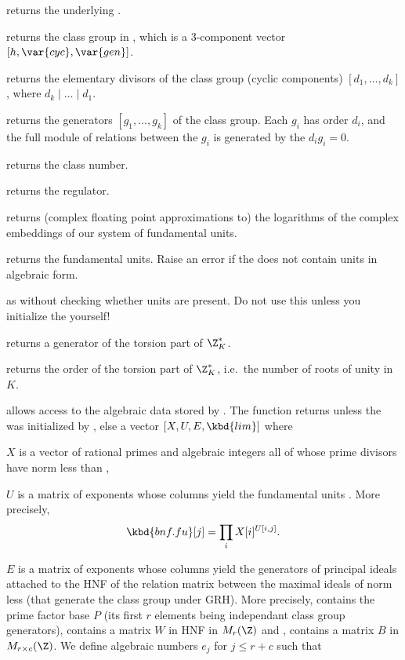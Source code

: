  returns the underlying .

 returns the class group in ,
which is a $3$-component vector $[h, \var{cyc}, \var{gen}]$.

 returns the elementary divisors
of the class group (cyclic components) $[d_1,\ldots, d_k]$, where
$d_k \mid \ldots \mid d_1$.

 returns the generators $[g_1,\ldots,g_k]$
of the class group. Each $g_i$ has order $d_i$, and the full module of relations
between the $g_i$ is generated by the $d_ig_i = 0$.

 returns the class number.

 returns the regulator.

 returns (complex floating point
approximations to) the logarithms of the complex embeddings of our system of
fundamental units.

 returns the fundamental units. Raise
an error if the  does not contain units in algebraic form.

 as  without
checking whether units are present. Do not use this unless
you initialize the  yourself!

 returns a generator of the torsion part
of $\Z_K^*$.

 returns the order of the torsion part of
$\Z_K^*$, i.e.~the number of roots of unity in $K$.

 allows access to the algebraic data
stored by . The function returns  unless the
 was initialized by , else a vector
$[X,U,E,\kbd{lim}]$ where

\item $X$ is a vector of rational primes and algebraic integers all of whose
prime divisors have norm less than ,

\item $U$ is a matrix of exponents whose columns yield the fundamental units
. More precisely,
$$\kbd{bnf.fu}[j] = \prod_i X[i]^{U[i,j]}.$$

\item $E$ is a matrix of exponents whose columns yield the generators
of principal ideals attached to the HNF of the  relation matrix
between the maximal ideals of norm less  (that generate the class
group under GRH). More precisely,  contains the prime factor
base $P$ (its first $r$ elements being independant class group generators),
 contains a matrix $W$ in HNF in $M_r(\Z)$ and
, contains a matrix $B$ in $M_{r \times c}(\Z)$. We define
algebraic numbers $e_j$ for $j \leq r+c$ such that

